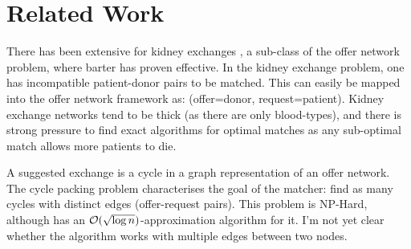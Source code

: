 \documentclass[main.tex]{subfiles}
\begin{document}
\section{Related Work}
There has been extensive for kidney exchanges \cite{Bir}\cite{Rot1}\cite{Rot2}\cite{Abr1}, a sub-class of the offer network problem, where barter has proven effective. In the kidney exchange problem, one has incompatible patient-donor pairs to be matched. This can easily be mapped into the offer network framework as: (offer=donor, request=patient). Kidney exchange networks tend to be thick (as there are only blood-types), and there is strong pressure to find exact algorithms for optimal matches as any sub-optimal match allows more patients to die.

A suggested exchange is a cycle in a graph representation of an offer network. The cycle packing problem \cite{Kri} characterises the goal of the matcher: find as many cycles with distinct edges (offer-request pairs). This problem is NP-Hard, although \cite{Kri} has an $\mathcal{O}(\sqrt{\log n})$-approximation algorithm for it. I'm not yet clear whether the algorithm works with multiple edges between two nodes.
\end{document}

